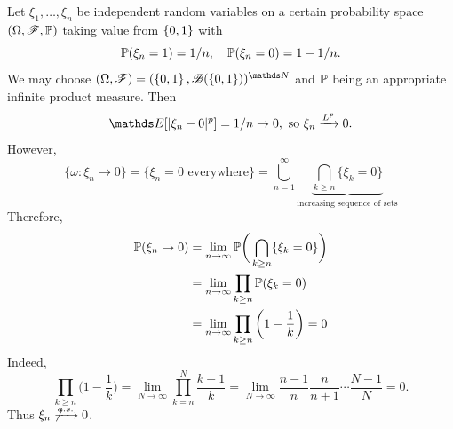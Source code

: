 \begin{example}
Let $\xi_1, \dots, \xi_n$ be independent random variables on a certain probability space $(\Omega,\mathcal{F},\mathbb{P})$ taking value from $\left\{ 0,1 \right \}$ with
\begin{equation*}
    \mathbb{P}(\xi_n = 1) = 1/n, \quad \mathbb{P}(\xi_n = 0) = 1 - 1/n.
\end{equation*}
We may choose $(\Omega,\F) = (\set{0,1}, \B(\set{0,1}))^{\N}$ and $\mathbb{P}$ being an appropriate infinite product measure. Then
\begin{equation*}
    \E[|\xi_n - 0|^p] = 1/n \to 0, \text{ so } \xi_n \xrightarrow{L^p} 0.
\end{equation*}
However, 
\begin{equation*}
    \{ \omega: \xi_n \to 0 \} = \{ \xi_n = 0 \text{ everywhere} \} = \bigcup_{n=1}^\infty \underbrace{\bigcap_{k \ge n} \{ \xi_k = 0 \}}_{\text{increasing sequence of sets}}
\end{equation*}
Therefore, 
\begin{align*}
    \mathbb{P}(\xi_n \to 0) &= \lim_{n \to \infty} \mathbb{P} \bigg(\bigcap_{k\ge n} \{ \xi_k = 0\} \bigg)\\
    &= \lim_{n \to \infty} \prod_{k \ge n} \mathbb{P}(\xi_k = 0)\\
    &= \lim_{n \to \infty} \prod_{k \ge n} \bigg(1 - \frac{1}{k}\bigg) = 0
\end{align*}
Indeed,
\begin{equation*}
    \prod_{k \ge n} \bigg( 1- \frac{1}{k} \bigg) = \lim_{N \to \infty} \prod_{k=n}^N \frac{k-1}{k} = \lim_{N \to \infty} \frac{n-1}{n} \frac{n}{n+1} \cdots \frac{N-1}{N} = 0.
\end{equation*}
Thus $\xi_n \not \xrightarrow{a.s.} 0$.
\end{example}

